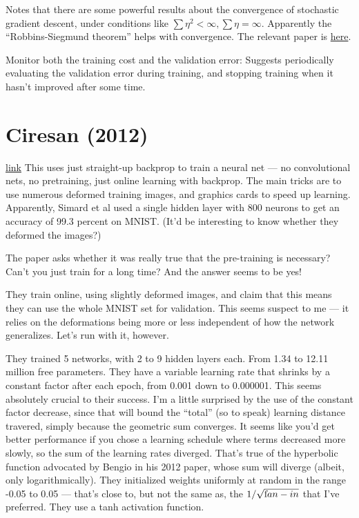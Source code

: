 \documentclass[12pt]{report}
\newcommand{\link}[2]{\href{#1}{#2}}
\begin{document}
Notes that there are some powerful results about the convergence of
stochastic gradient descent, under conditions like $\sum \eta^2 <
\infty, \sum \eta = \infty$.  Apparently the ``Robbins-Siegmund
theorem'' helps with convergence.  The relevant paper is
\link{http://scholar.google.ca/scholar?cluster=509989913518206088\&hl=en\&as\_sdt=0,5}{here}.

Monitor both the training cost and the validation error: Suggests
periodically evaluating the validation error during training, and
stopping training when it hasn't improved after some time.

\section{Ciresan (2012)}

\link{http://arxiv.org/abs/1003.0358}{link} This uses just straight-up
backprop to train a neural net --- no convolutional nets, no
pretraining, just online learning with backprop.  The main tricks are
to use numerous deformed training images, and graphics cards to speed
up learning.  Apparently, Simard et al used a single hidden layer with
800 neurons to get an accuracy of 99.3 percent on MNIST.  (It'd be
interesting to know whether they deformed the images?)

The paper asks whether it was really true that the pre-training is
necessary?  Can't you just train for a long time?  And the answer
seems to be yes!

They train online, using slightly deformed images, and claim that this
means they can use the whole MNIST set for validation.  This seems
suspect to me --- it relies on the deformations being more or less
independent of how the network generalizes.  Let's run with it,
however.

They trained 5 networks, with 2 to 9 hidden layers each.  From 1.34 to
12.11 million free parameters.  They have a variable learning rate
that shrinks by a constant factor after each epoch, from 0.001 down to
0.000001.  This seems absolutely crucial to their success. I'm a
little surprised by the use of the constant factor decrease, since
that will bound the ``total'' (so to speak) learning distance
travered, simply because the geometric sum converges.  It seems like
you'd get better performance if you chose a learning schedule where
terms decreased more slowly, so the sum of the learning rates
diverged.  That's true of the hyperbolic function advocated by Bengio
in his 2012 paper, whose sum will diverge (albeit, only
logarithmically).  They initialized weights uniformly at random in the
range -0.05 to 0.05 --- that's close to, but not the same as, the
$1/\sqrt{\mbox fan-in}$ that I've preferred.  They use a tanh
activation function.
\end{document}
